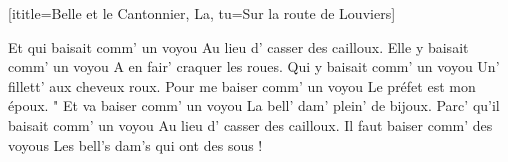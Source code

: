 [ititle={Belle et le Cantonnier, La}, tu={Sur la route de Louviers}]

\beginverse
{}
Et qui baisait comm' un voyou
Au lieu d' casser des cailloux.
\endverse
\beginverse
{}
Elle y baisait comm' un voyou
A en fair' craquer les roues.
\endverse
\beginverse
{}
Qui y baisait comm' un voyou
Un' fillett' aux cheveux roux.
\endverse
\beginverse
{}
Pour me baiser comm' un voyou
Le préfet est mon époux. "
\endverse
\beginverse
{}
Et va baiser comm' un voyou
La bell' dam' plein' de bijoux.
\endverse
\beginverse
{}
Parc' qu'il baisait comm' un voyou
Au lieu d' casser des cailloux.
\endverse
\beginverse
{}
Il faut baiser comm' des voyous
Les bell's dam's qui ont des sous !
\endverse
\endsong
